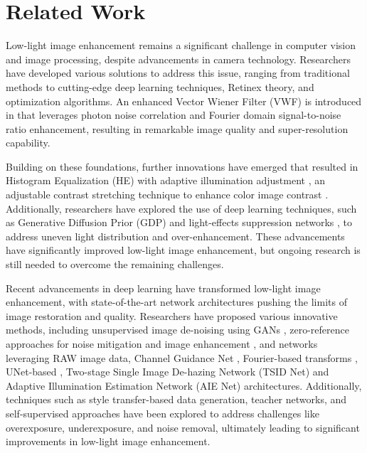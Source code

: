 \section{Related Work}
Low-light image enhancement remains a significant challenge in computer vision and image processing, despite advancements in camera technology. Researchers have developed various solutions to address this issue, ranging from traditional methods to cutting-edge deep learning techniques, Retinex theory, and optimization algorithms. An enhanced Vector Wiener Filter (VWF) is introduced in \cite{ford1997reconstruction} that leverages photon noise correlation and Fourier domain signal-to-noise ratio enhancement, resulting in remarkable image quality and super-resolution capability.

Building on these foundations, further innovations have emerged that resulted in Histogram Equalization (HE) with adaptive illumination adjustment \cite{banik2018contrast}, an adjustable contrast stretching technique to enhance color image contrast \cite{al2018contrast}. Additionally, researchers have explored the use of deep learning techniques, such as Generative Diffusion Prior (GDP) \cite{fei2023generative} and light-effects suppression networks \cite{li2023pixel,lu2022progressive,zhou2023fusion}, to address uneven light distribution and over-enhancement. These advancements have significantly improved low-light image enhancement, but ongoing research is still needed to overcome the remaining challenges.

Recent advancements in deep learning have transformed low-light image enhancement, with state-of-the-art network architectures pushing the limits of image restoration and quality. Researchers have proposed various innovative methods, including unsupervised image de-noising using GANs \cite{lin2023unsupervised}, zero-reference approaches for noise mitigation and image enhancement \cite{cao2024zero,li2023zero1}, and networks leveraging RAW image data, Channel Guidance Net \cite{fu2023raw}, Fourier-based transforms \cite{wang2023fourllie}, UNet-based \cite{li2024color}, Two-stage Single Image De-hazing Network (TSID Net) \cite{wang2024tsid} and Adaptive Illumination Estimation Network (AIE Net) \cite{yu2024joint} architectures. Additionally, techniques such as style transfer-based data generation, teacher networks, and self-supervised approaches have been explored to address challenges like overexposure, underexposure, and noise removal, ultimately leading to significant improvements in low-light image enhancement.


